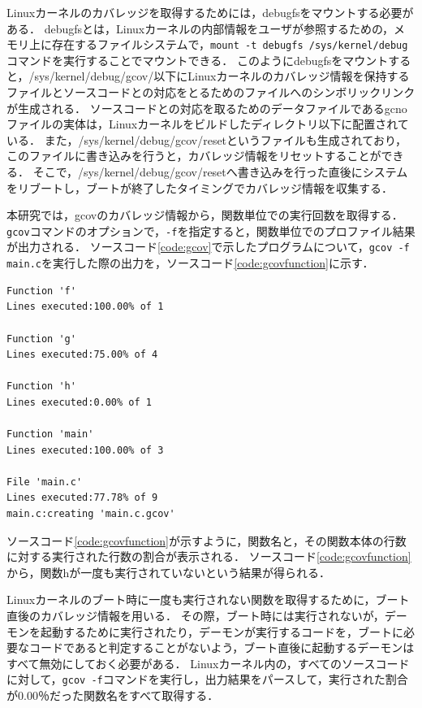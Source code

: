 \documentclass[graduation-thesis]{mlarticle}
\begin{document}
Linuxカーネルのカバレッジを取得するためには，debugfsをマウントする必要がある．
debugfsとは，Linuxカーネルの内部情報をユーザが参照するための，メモリ上に存在するファイルシステムで，\texttt{mount -t debugfs /sys/kernel/debug}コマンドを実行することでマウントできる．
このようにdebugfsをマウントすると，/sys/kernel/debug/gcov/以下にLinuxカーネルのカバレッジ情報を保持するファイルとソースコードとの対応をとるためのファイルへのシンボリックリンクが生成される．
ソースコードとの対応を取るためのデータファイルであるgcnoファイルの実体は，Linuxカーネルをビルドしたディレクトリ以下に配置されている．
また，/sys/kernel/debug/gcov/resetというファイルも生成されており，このファイルに書き込みを行うと，カバレッジ情報をリセットすることができる．
そこで，/sys/kernel/debug/gcov/resetへ書き込みを行った直後にシステムをリブートし，ブートが終了したタイミングでカバレッジ情報を収集する．

本研究では，gcovのカバレッジ情報から，関数単位での実行回数を取得する．
\texttt{gcov}コマンドのオプションで，\texttt{-f}を指定すると，関数単位でのプロファイル結果が出力される．
ソースコード\ref{code:gcov}で示したプログラムについて，\texttt{gcov -f main.c}を実行した際の出力を，ソースコード\ref{code:gcovfunction}に示す．

\begin{lstlisting}[caption=関数単位でのプロファイル結果, label=code:gcovfunction]
% gcov -f main.c
Function 'f'
Lines executed:100.00% of 1

Function 'g'
Lines executed:75.00% of 4

Function 'h'
Lines executed:0.00% of 1

Function 'main'
Lines executed:100.00% of 3

File 'main.c'
Lines executed:77.78% of 9
main.c:creating 'main.c.gcov'
\end{lstlisting}

ソースコード\ref{code:gcovfunction}が示すように，関数名と，その関数本体の行数に対する実行された行数の割合が表示される．
ソースコード\ref{code:gcovfunction}から，関数hが一度も実行されていないという結果が得られる．

Linuxカーネルのブート時に一度も実行されない関数を取得するために，ブート直後のカバレッジ情報を用いる．
その際，ブート時には実行されないが，デーモンを起動するために実行されたり，デーモンが実行するコードを，ブートに必要なコードであると判定することがないよう，ブート直後に起動するデーモンはすべて無効にしておく必要がある．
Linuxカーネル内の，すべてのソースコードに対して，\texttt{gcov -f}コマンドを実行し，出力結果をパースして，実行された割合が0.00％だった関数名をすべて取得する．
\end{document}
